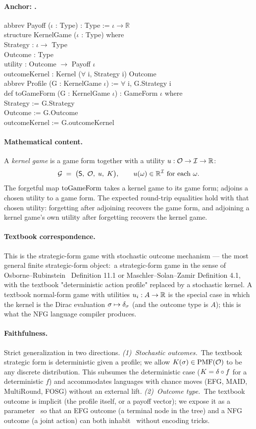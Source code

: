 \documentclass[11pt]{article}
\renewcommand{\TT}[1]{\texttt{\detokenize{#1}}}
\newcommand{\Anchor}[1]{\paragraph{Anchor: \texorpdfstring{\TT{#1}}{#1}.}}
\newcommand{\Mathematical}{\paragraph{Mathematical content.}}
\newcommand{\Textbook}{\paragraph{Textbook correspondence.}}
\newcommand{\Faithfulness}{\paragraph{Faithfulness.}}
\begin{document}
\Anchor{KernelGame}
\begin{leanbox}
abbrev Payoff ($\iota$ : Type) : Type := $\iota \to \mathbb{R}$\\[3pt]
structure KernelGame ($\iota$ : Type) where\\
\bd Strategy : $\iota \to$ Type\\
\bd Outcome  : Type\\
\bd utility  : Outcome $\to$ Payoff $\iota$\\
\bd outcomeKernel : Kernel ($\forall$ i, Strategy i) Outcome\\[3pt]
abbrev Profile (G : KernelGame $\iota$) := $\forall$ i, G.Strategy i\\[3pt]
def toGameForm (G : KernelGame $\iota$) : GameForm $\iota$ where\\
\bd Strategy := G.Strategy\\
\bd Outcome  := G.Outcome\\
\bd outcomeKernel := G.outcomeKernel
\end{leanbox}

\Mathematical
A \emph{kernel game} is a game form together with a utility
$u : \mathcal{O} \to \mathcal{I} \to \mathbb{R}$:
\[
  \mathcal{G} \;=\; \bigl(\mathsf{S},\;\mathcal{O},\;u,\;K\bigr),
  \qquad u(\omega) \in \mathbb{R}^{\mathcal{I}} \text{ for each } \omega.
\]
The forgetful map $\mathrm{toGameForm}$ takes a kernel game to its game form;
\TT{withUtility} adjoins a chosen utility to a game form.  The
expected round-trip equalities hold with that chosen utility:
forgetting after adjoining recovers the game form, and adjoining a
kernel game's own utility after forgetting recovers the kernel game.

\Textbook
This is the strategic-form game with stochastic outcome
mechanism — the most general finite strategic-form object:\ a
strategic-form game in the sense of
Osborne–Rubinstein~\citep{OsborneRubinstein1994} Definition 11.1
or Maschler–Solan–Zamir Definition 4.1, with the textbook
"deterministic action profile" replaced by a stochastic kernel.
A textbook normal-form game with utilities $u_i : A \to \mathbb{R}$ is the
special case in which the kernel is the Dirac evaluation
$\sigma \mapsto \delta_{\sigma}$ (and the outcome type is $A$);
this is what the NFG language compiler produces.

\Faithfulness
Strict generalization in two directions.
\emph{(1)~Stochastic outcomes.}\ The textbook strategic form is
deterministic given a profile; we allow $K(\sigma) \in
\mathrm{PMF}(\mathcal{O})$ to be any discrete distribution.  This subsumes
the deterministic case ($K = \delta \circ f$ for a deterministic
$f$) and accommodates languages with chance moves (EFG, MAID,
MultiRound, FOSG) without an external lift.
\emph{(2)~Outcome type.}\ The textbook outcome is implicit (the
profile itself, or a payoff vector); we expose it as a parameter
\Outcome\ so that an EFG outcome (a terminal node in the tree) and
a NFG outcome (a joint action) can both inhabit \KG\ without
encoding tricks.
\end{document}
